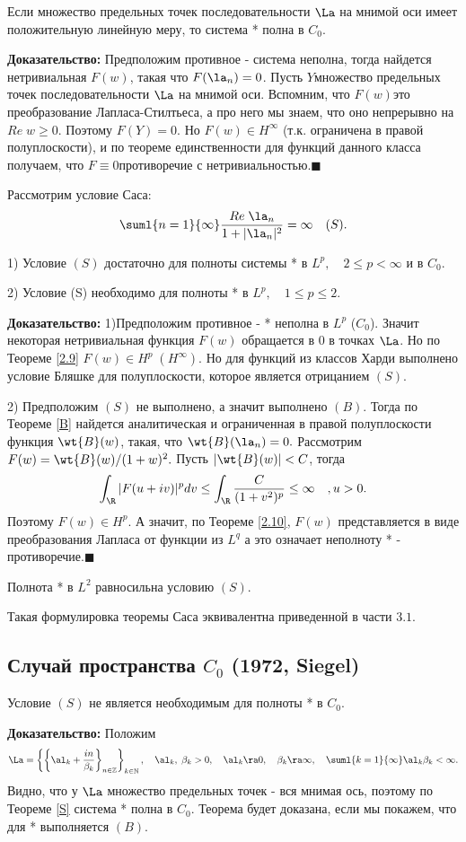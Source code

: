 \documentclass[a4paper]{article}
\begin{document}
\begin{theorems}\label{S}
Если множество предельных точек последовательности $\La$ на
мнимой оси имеет положительную линейную меру, то система * полна в
$C_0$.
\end{theorems}
\textbf{Доказательство:} Предположим противное - система неполна, тогда найдется нетривиальная $F(w)$, такая что
$F(\la_n)=0$. Пусть $Y$\т множество предельных точек последовательности $\La$ на мнимой оси. Вспомним,
что $F(w)$\т это преобразование Лапласа-Стилтьеса, а про него мы знаем, что оно непрерывно на $Re\;w\ge0$.
Поэтому $F(Y)=0$. Но $F(w)\in H^{\infty}$ (т.к. ограничена в правой полуплоскости), и по теореме
единственности для функций данного класса получаем, что $F\equiv0$\т противоречие с
нетривиальностью.$\blacksquare$

\begin{theorems}
Рассмотрим условие Саса:
$$\suml{n=1}{\infty}\frac{Re\;\la_n}{1+|\la_n|^2}=\infty\quad(S).$$

1) Условие $(S)$ достаточно для полноты системы * в $L^p,\quad
2\le p<\infty$ и в $C_0$.

2) Условие (S) необходимо для полноты * в $L^p,\quad 1\le
p\le2.$
\end{theorems}
\textbf{Доказательство:} 1)Предположим противное - * неполна в
$L^p$ ($C_0$). Значит некоторая нетривиальная функция $F(w)$
обращается в $0$ в точках $\La$. Но по Теореме \ref{2.9}
$F(w)\in H^p \;(H^{\infty}).$ Но для функций из классов Харди
выполнено условие Бляшке для полуплоскости, которое является
отрицанием $(S).$

2) Предположим $(S)$ не выполнено, а значит выполнено $(B)$. Тогда
по Теореме \ref{B} найдется аналитическая и ограниченная в правой
полуплоскости функция $\wt{B}(w)$, такая, что
$\wt{B}(\la_n)=0.$ Рассмотрим
$F(w)=\wt{B}(w)/(1+w)^2.$ Пусть $|\wt{B}(w)|<C$,
тогда
$$\int_{\R }|F(u+iv)|^pdv\le\int_{\R }\frac{C}{(1+v^2)^p}\le\infty\quad,
u>0.$$ Поэтому $F(w)\in H^p.$ А значит, по Теореме \ref{2.10},
$F(w)$ представляется в виде преобразования Лапласа от функции из
$L^q$ а это означает неполноту * - противоречие.$\blacksquare$

\begin{sled}
Полнота * в $L^2$ равносильна условию $(S).$
\end{sled}

Такая формулировка теоремы Саса эквивалентна приведенной в части
$3.1.$

\subsection{Случай пространства $C_0$ (1972, Siegel)}
\begin{theorems}
Условие $(S)$ не является необходимым для полноты * в $C_0$.
\end{theorems}
\textbf{Доказательство:} Положим
$$\La=\left\{\left\{\al_k+\frac{in}{\beta_k}\right\}_{n\in
\mathbb{Z}}\right\}_{k\in\mathbb{N}},\quad\al_k,\;\beta_k>0,\quad\al_k\ra0,\quad\beta_k\ra\infty,\quad\suml{k=1}{\infty}\al_k\beta_k<\infty.$$
Видно, что у $\La$ множество предельных точек - вся мнимая
ось, поэтому по Теореме \ref{S} система * полна в $C_0.$ Теорема
будет доказана, если мы покажем, что для * выполняется $(B).$
\end{document}
